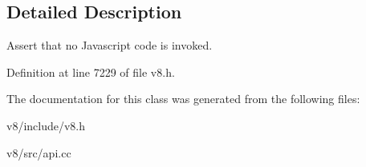 \subsection{Detailed Description}
Assert that no Javascript code is invoked. 

Definition at line 7229 of file v8.\+h.



The documentation for this class was generated from the following files\+:\begin{DoxyCompactItemize}
\item 
v8/include/v8.\+h\item 
v8/src/api.\+cc\end{DoxyCompactItemize}
